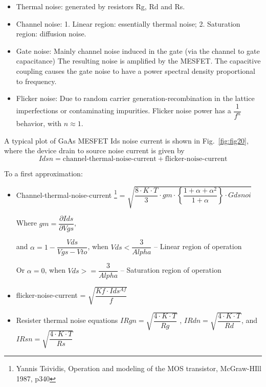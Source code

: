 \begin{itemize}
 \item Thermal noise: generated by resistors Rg, Rd and Rs.
 \item Channel noise: 1. Linear region: essentially thermal noise; 2. Saturation region: diffusion noise.
 \item Gate noise:  Mainly channel noise induced in the gate (via the channel to gate capacitance) The resulting noise is amplified by the MESFET. The capacitive coupling causes the gate noise to have a power spectral density proportional to frequency.
 \item Flicker noise: Due to random carrier generation-recombination in the lattice imperfections or contaminating impurities. Flicker noise power has a $\dfrac{1}{f^{n}}$ behavior, with $n \approx 1.$

\end{itemize}
A typical plot of GaAs MESFET Ids noise current is shown in
Fig.~\ref{fig:fig20}, where the device drain to source noise current
is given by
\begin{equation}
 Idsn = \textrm{channel-thermal-noise-current} + \textrm{flicker-noise-current}
\end{equation}

To a first approximation:
\begin{itemize}
 \item Channel-thermal-noise-current%
	 \footnote{Yannis Tsividis, Operation and modeling of the MOS transistor, McGraw-HIll 1987, p340}%
	 = $\sqrt{\dfrac{8 \cdot K \cdot T}{3} \cdot gm \cdot \left\lbrace
	        \dfrac{1+ \alpha + \alpha^{2}}{1+\alpha} \right\rbrace  \cdot Gdsnoi} $


Where $gm = \dfrac{\partial Ids}{\partial Vgs}$,


and  $\alpha = 1 -\dfrac{Vds}{Vgs-Vto}$, when $Vds < \dfrac{3}{Alpha} $ -- Linear region of operation


Or \hspace{1mm}    $\alpha = 0$, when  $ Vds >= \dfrac{3}{Alpha} $ -- Saturation region of operation

\item flicker-noise-current = $\sqrt{\dfrac{Kf \cdot Ids^{Af}}{f}}$

\item Resister thermal noise equations $IRgn = \sqrt{\dfrac{4 \cdot K \cdot T}{Rg}}$ , $IRdn = \sqrt{\dfrac{4 \cdot K \cdot T}{Rd}}$, and
$IRsn = \sqrt{\dfrac{4 \cdot K \cdot T}{Rs}}$
\end{itemize}


